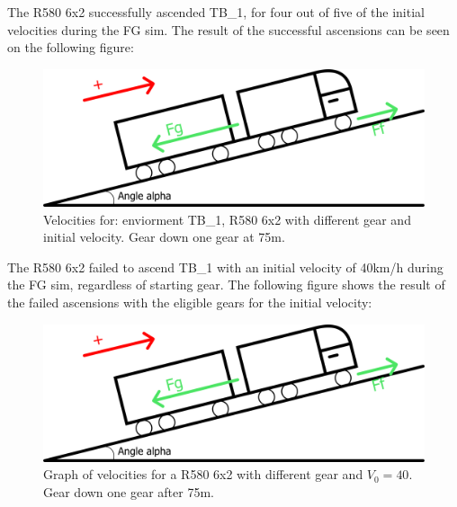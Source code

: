 \documentclass[noprint]{uit-thesis}
\begin{document}
The R580 6x2 successfully ascended TB\_1, for four out of five of the initial velocities during the FG sim. The result of the successful ascensions can be seen on the following figure:
\begin{figure}[H]
\includegraphics[width=\textwidth, height=0.45\textheight]{photo/freeBodyDiagram.png}
\caption{Velocities for: enviorment TB\_1, R580 6x2 with different gear and initial velocity. Gear down one gear at 75m.}
\label{fig:TB1_6x2_GR}
\end{figure}

The R580 6x2 failed to ascend TB\_1 with an initial velocity of 40km/h during the FG sim, regardless of starting gear. The following figure shows the result of the failed ascensions with the eligible gears for the initial velocity:
\begin{figure}[H]
\includegraphics[width=\textwidth, height=0.45\textheight]{photo/freeBodyDiagram.png}
\caption{Graph of velocities for a R580 6x2 with different gear and $V_0 = 40$. Gear down one gear after 75m.}
\label{fig:TB1_6x2_GR_40}
\end{figure}
\end{document}
